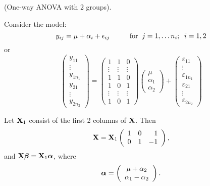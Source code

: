 \bexa
(One-way ANOVA with 2 groups).

Consider the model:
$$
y_{ij} = \mu + \alpha_i +  \epsilon_{ij}  \hskip1cm {\mbox{for}} \; \;  j = 1,\ldots n_i; \;\; i = 1,2
$$
or
$$
\left( \begin{array}{c}
y_{11} \\ \vdots \\ y_{1n_1} \\
y_{21} \\ \vdots \\ y_{2n_2}
\end{array} \right) =
\left( \begin{array}{ccc}
1 & 1 & 0\\ 
\vdots& \vdots &\vdots\\ 
1 & 1 & 0\\
1 & 0 & 1\\ 
\vdots & \vdots& \vdots \\ 
1 & 0 & 1 
\end{array} \right)
\left( \begin{array}{c} \mu\\ \alpha_1 \\ \alpha_2 \end{array} \right) +
\left( \begin{array}{c}
\varepsilon_{11} \\ \vdots \\ \varepsilon_{1n_1} \\
\varepsilon_{21} \\ \vdots \\ \varepsilon_{2n_2}
\end{array} \right)
$$

\vb

Let $\mathbf{X}_1$ consist of the first 2 columns of $\mathbf{X}$. Then
$$
\mathbf{X}=\mathbf{X}_1\left(\begin{array}{rrr}1&0&1\\0&1&-1\end{array}\right),
$$
and $\mathbf{X}\mbox{\boldmath $\beta$}=\mathbf{X}_1\mbox{\boldmath $\alpha$}$, where
$$
\mbox{\boldmath $\alpha$} =
\left(\begin{array}{c}\mu+\alpha_2\\\alpha_1-\alpha_2\end{array}\right).
$$

